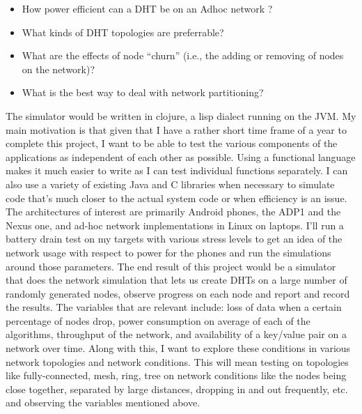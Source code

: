 \documentclass[a4paper,10pt]{article}
\newcommand{\cmt}[2]{#2}
\begin{document}
\begin{itemize}
 \item How power efficient can \cmt{}{a} DHT \cmt{}{be} on \cmt{}{an} Adhoc network \cmt{be}{}?
 \item What kinds of \cmt{network}{DHT} topologies are preferrable?
 \item What are the effects of \cmt{}{node ``churn''} \cmt{}{(i.e., the adding or removing of nodes on the network)}?
 \item What is the best way to deal with network partitioning?
\end{itemize}
The simulator would be written in clojure, a lisp dialect running on the \cmt{java}{} JVM. My main motivation is that given that I have a rather short time frame of a year to complete this project, I want to be able to test the various components of the applications as independent of each other as possible. Using a functional language makes it much easier to write as I can test individual functions separately. I can also use \cmt{various}{a variety of} existing Java and C libraries when \cmt{needed}{necessary} \cmt{and}{to} simulate code that's much closer to the actual system\cmt{'s}{} code \cmt{}{or when efficiency is an issue}. The architectures \cmt{I'll be looking}{of interest are} primarily \cmt{would be} Android phones\cmt{-}{,} the ADP1 and the Nexus one\cmt{}{,} and ad-hoc network implementations in Linux \cmt{in}{on} laptops. I'll run a battery drain test on my targets with various stress levels to get an idea of the network usage with respect to power for the phones and run the simulations around those parameters.
The end result of this project would be a simulator that does the network simulation that lets us create DHTs on a \cmt{random}{large} number of \cmt{}{randomly generated} nodes, observe progress on each node and report and record the results. The variables that are relevant \cmt{are -}{include:} loss of data when a certain percentage of nodes drop, power consumption on average of each of the algorithms, throughput of the network, \cmt{}{and} availability of a key/value pair on a network over time. Along with this, I want to explore these conditions in various network topologies and network conditions. This will mean testing on topologies like fully-connected, mesh, ring, tree on network conditions like the nodes being close together, separated by large distances, dropping in and out frequently, etc. and observing the variables mentioned above.
\end{document}
